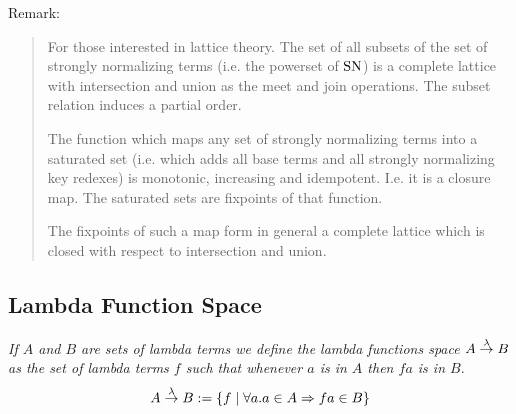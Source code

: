 Remark:
\begin{quote}

    For those interested in lattice theory. The set of all subsets of the set of
    strongly normalizing terms (i.e. the powerset of $\text{SN}$) is a complete
    lattice with intersection and union as the meet and join operations. The
    subset relation induces a partial order.

    The function which maps any set of
    strongly normalizing terms into a saturated set (i.e. which adds all base
    terms and all strongly normalizing key redexes) is monotonic, increasing and
    idempotent. I.e. it is a closure map. The saturated sets are fixpoints of
    that function.

    The fixpoints of such a map form in general a complete
    lattice which is closed with respect to intersection and union.

\end{quote}







\subsection{Lambda Function Space}


\begin{definition}
    \emph{If $A$ and $B$ are sets of lambda terms we define the lambda functions
    space $A \stackrel{\lambda}{\to} B$ as the set of lambda terms $f$ such that whenever $a$
    is in $A$ then $fa$ is in $B$}.
    $$
    A \stackrel{\lambda}{\to} B := {\{f \mid \forall a. a \in A \Rightarrow fa \in B\}}
    $$
\end{definition}







